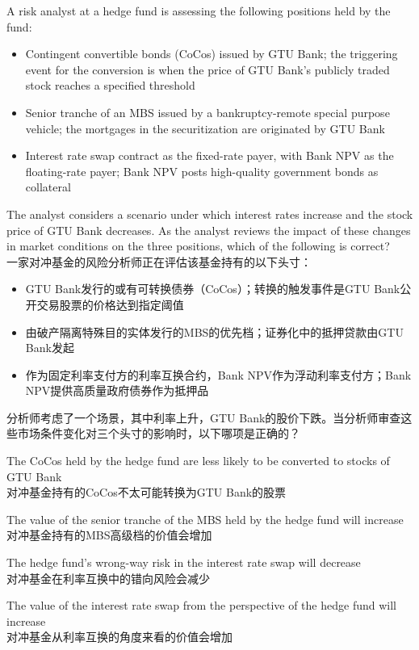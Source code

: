 \documentclass{article}
\newcounter{question} %
\begin{document}
\begin{question}
    A risk analyst at a hedge fund is assessing the following positions held by the fund:
    \begin{itemize}
        \item Contingent convertible bonds (CoCos) issued by GTU Bank; the triggering event for the conversion is when the price of GTU Bank's publicly traded stock reaches a specified threshold
        \item Senior tranche of an MBS issued by a bankruptcy-remote special purpose vehicle; the mortgages in the securitization are originated by GTU Bank
        \item Interest rate swap contract as the fixed-rate payer, with Bank NPV as the floating-rate payer; Bank NPV posts high-quality government bonds as collateral
    \end{itemize}
    The analyst considers a scenario under which interest rates increase and the stock price of GTU Bank decreases. As the analyst reviews the impact of these changes in market conditions on the three positions, which of the following is correct?
    \\    一家对冲基金的风险分析师正在评估该基金持有的以下头寸：
    \begin{itemize}
        \item GTU Bank发行的或有可转换债券（CoCos）；转换的触发事件是GTU Bank公开交易股票的价格达到指定阈值
        \item 由破产隔离特殊目的实体发行的MBS的优先档；证券化中的抵押贷款由GTU Bank发起
        \item 作为固定利率支付方的利率互换合约，Bank NPV作为浮动利率支付方；Bank NPV提供高质量政府债券作为抵押品
    \end{itemize}
    分析师考虑了一个场景，其中利率上升，GTU Bank的股价下跌。当分析师审查这些市场条件变化对三个头寸的影响时，以下哪项是正确的？
\end{question}

\begin{choices}
    \item The CoCos held by the hedge fund are less likely to be converted to stocks of GTU Bank\\
    对冲基金持有的CoCos不太可能转换为GTU Bank的股票
    \item The value of the senior tranche of the MBS held by the hedge fund will increase\\
    对冲基金持有的MBS高级档的价值会增加
    \item The hedge fund's wrong-way risk in the interest rate swap will decrease\\
    对冲基金在利率互换中的错向风险会减少
    \item The value of the interest rate swap from the perspective of the hedge fund will increase\\
    对冲基金从利率互换的角度来看的价值会增加
\end{choices}
\end{document}
